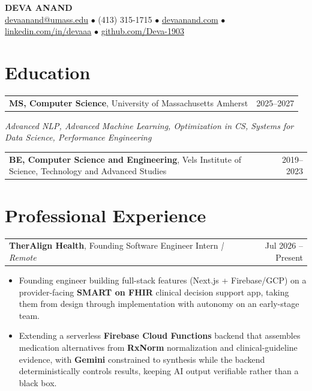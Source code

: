 \documentclass[letterpaper,11pt]{article}
\makeatletter
\newcommand{\eduItem}[3]{%
  \begin{tabular*}{\textwidth}{@{}l@{\extracolsep{\fill}}r@{}}
    \textbf{#1}, #2 & #3 \\
  \end{tabular*}\par
}
\newcommand{\expItem}[4]{%
  \vspace{2pt}
  \begin{tabular*}{\textwidth}{@{}l@{\extracolsep{\fill}}r@{}}
    \textbf{#1}, #2 \textit{| #3} & #4 \\
  \end{tabular*}\par\vspace{-3pt}
}
\makeatother
\begin{document}
\begin{center}
    {\fontsize{18}{20}\selectfont\bfseries DEVA ANAND}\\ \vspace{3pt}
    {\small
    \href{mailto:devaanand@umass.edu}{devaanand@umass.edu}
    \enspace$\bullet$\enspace
    (413) 315-1715
    \enspace$\bullet$\enspace
    \href{https://devaanand.com}{devaanand.com}
    \enspace$\bullet$\enspace
    \href{https://linkedin.com/in/devaaa/}{linkedin.com/in/devaaa}
    \enspace$\bullet$\enspace
    \href{https://github.com/Deva-1903}{github.com/Deva-1903}}
\end{center}
\vspace{-8pt}

\section{Education}
\eduItem{MS, Computer Science}{University of Massachusetts Amherst}{2025--2027}
{\small\textit{Advanced NLP, Advanced Machine Learning, Optimization in CS, Systems for Data Science, Performance Engineering}}\par
\vspace{3pt}
\eduItem{BE, Computer Science and Engineering}{Vels Institute of Science, Technology and Advanced Studies}{2019--2023}

\section{Professional Experience}

\expItem{TherAlign Health}{Founding Software Engineer Intern}{Remote}{Jul 2026 -- Present}
\begin{itemize}
  \item Founding engineer building full-stack features (Next.js + Firebase/GCP) on a provider-facing \textbf{SMART on FHIR} clinical decision support app, taking them from design through implementation with autonomy on an early-stage team.
  \item Extending a serverless \textbf{Firebase Cloud Functions} backend that assembles medication alternatives from \textbf{RxNorm} normalization and clinical-guideline evidence, with \textbf{Gemini} constrained to synthesis while the backend deterministically controls results, keeping AI output verifiable rather than a black box.
\end{itemize}
\end{document}
